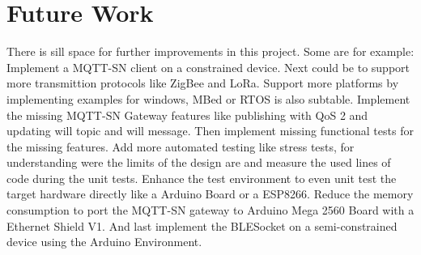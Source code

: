 \section{Future Work}
There is sill space for further improvements in this project. Some are for example:
Implement a MQTT-SN client on a constrained device.
Next could be to support more transmittion protocols like ZigBee and LoRa.
Support more platforms by implementing examples for windows, MBed or RTOS is also subtable.
Implement the missing MQTT-SN Gateway features like publishing with QoS 2 and updating will topic and will message.
Then implement missing functional tests for the missing features.
Add more automated testing like stress tests, for understanding were the limits of the design are and measure the used lines of code during the unit tests.
Enhance the test environment to even unit test the target hardware directly like a Arduino Board or a ESP8266.
Reduce the memory consumption to port the MQTT-SN gateway to Arduino Mega 2560 Board with a Ethernet Shield V1.
And last implement the BLESocket on a semi-constrained device using the Arduino Environment.